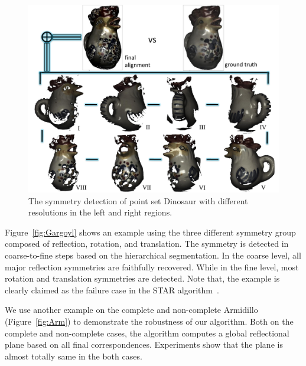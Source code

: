 \begin{figure}[t]
\centering
  \includegraphics[width=0.99\linewidth]{figures/Rooster.pdf}
  \caption{The symmetry detection of point set Dinosaur with different resolutions in the left and right regions.}
\label{fig:Point}
\end{figure}

Figure~\ref{fig:Gargoyl} shows an example using the three different symmetry group composed of reflection, rotation, and translation.
The symmetry is detected in coarse-to-fine steps based on the hierarchical segmentation.
In the coarse level, all major reflection symmetries are faithfully recovered.
While in the fine level, most rotation and translation symmetries are detected.
Note that, the example is clearly claimed as the failure case in the STAR algorithm~\cite{berner2011}.

We use another example on the complete and non-complete Armidillo (Figure~\ref{fig:Arm}) to demonstrate the robustness of our algorithm.
Both on the complete and non-complete cases, the algorithm computes a global reflectional plane based on all final correspondences.
Experiments show that the plane is almost totally same in the both cases.


